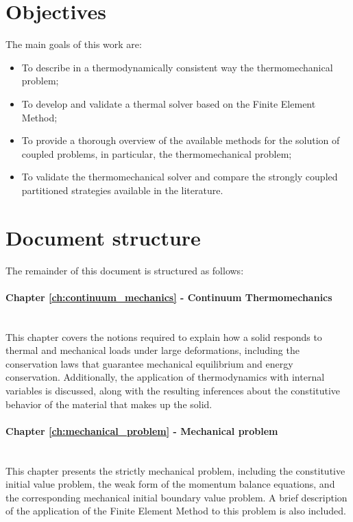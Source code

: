 \section{Objectives}

The main goals of this work are:
\begin{itemize}
    \item To describe in a thermodynamically consistent way the thermomechanical problem;
    \item To develop and validate a thermal solver based on the Finite Element Method;
    \item To provide a thorough overview of the available methods for the solution of coupled problems, in particular, the thermomechanical problem;
    \item To validate the thermomechanical solver and compare the strongly coupled partitioned strategies available in the literature.
\end{itemize}

\section{Document structure}

The remainder of this document is structured as follows:

\paragraph{Chapter \ref{ch:continuum_mechanics} - Continuum Thermomechanics}\mbox{}\\
This chapter covers the notions required to explain how a solid responds to thermal and mechanical loads under large deformations, including the conservation laws that guarantee mechanical equilibrium and energy conservation.
Additionally, the application of thermodynamics with internal variables is discussed, along with the resulting inferences about the constitutive behavior of the material that makes up the solid.

\paragraph{Chapter \ref{ch:mechanical_problem} - Mechanical problem}\mbox{}\\
This chapter presents the strictly mechanical problem, including the constitutive initial value problem, the weak form of the momentum balance equations, and the corresponding mechanical initial boundary value problem.
A brief description of the application of the Finite Element Method to this problem is also included.

